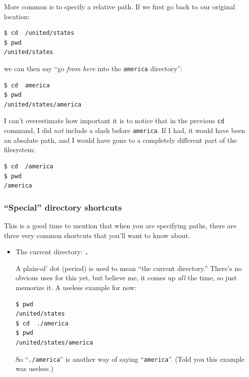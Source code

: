 \begin{enumerate}
More common is to specify a relative path. If we first go back to our original
location:

\begin{Verbatim}[fontsize=\small]
$ cd  /united/states
$ pwd
/united/states
\end{Verbatim}

we can then say ``go \textit{from here} into the \texttt{america} directory'':

\begin{Verbatim}[fontsize=\small]
$ cd  america
$ pwd
/united/states/america
\end{Verbatim}

I can't overestimate how important it is to notice that in the previous
\texttt{cd} command, I did \textit{not} include a slash before
\texttt{america}. If I had, it would have been an absolute path, and I would
have gone to a completely different part of the filesystem:

\begin{Verbatim}[fontsize=\small]
$ cd  /america
$ pwd
/america
\end{Verbatim}

\subsubsection{``Special'' directory shortcuts}

This is a good time to mention that when you are specifying paths, there are
three very common shortcuts that you'll want to know about.


\begin{itemize}
\itemsep1em

\item The current directory: \texttt{\textbf{.}}

A plain-ol' dot (period) is used to mean ``the current directory.'' There's no
obvious uses for this yet, but believe me, it comes up \textit{all} the time,
so just memorize it. A useless example for now:

\begin{Verbatim}[fontsize=\small]
$ pwd
/united/states
$ cd  ./america
$ pwd
/united/states/america
\end{Verbatim}

So ``\texttt{./america}'' is another way of saying ``\texttt{america}''. (Told
you this example was useless.)


\end{itemize}
\end{enumerate}
